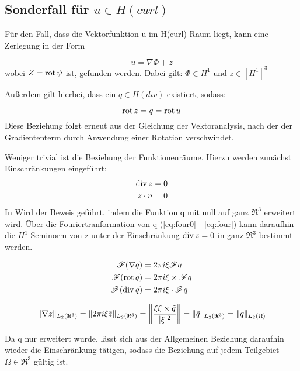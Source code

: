 \subsection{Sonderfall f\"ur $u\in H(curl)$}
F\"ur den Fall, dass die Vektorfunktion u im H(curl) Raum liegt, kann eine Zerlegung in der Form \par
\begin{equation}
	u = \nabla\Phi + z
\end{equation}
wobei $Z = \mathrm{rot}\, \psi$ ist, gefunden werden.
Dabei gilt: $\Phi\in H^1$ und $z\in [H^1]^3$\par
Au\ss{}erdem gilt hierbei, dass ein $q\in H(div)$ existiert, sodass:\par
\begin{equation}
	\mathrm{rot}\, z = q = \mathrm{rot}\, u
	\label{eq:qdef}
\end{equation}
Diese Beziehung folgt erneut aus der Gleichung der Vektoranalysis, nach der der Gradiententerm durch Anwendung einer Rotation verschwindet.
\par
Weniger trivial ist die Beziehung der Funktionenr\"aume. Hierzu werden zun\"achst Einschr\"ankungen eingef\"uhrt:
\begin{align}
	\mathrm{div}\, z &= 0\\
	z\cdot n &= 0
\end{align}
In \cite[S.24ff]{Schberl2009NumericalMF} Wird der Beweis gef\"uhrt, indem die Funktion q mit null auf ganz $\Re^3$ erweitert wird. \"Uber die Fouriertranformation von q (\ref{eq:four0} - \ref{eq:four}) kann daraufhin die $H^1$ Seminorm von z unter der Einschr\"ankung $\mathrm{div}\, z =0$ in ganz $\Re^3$ bestimmt werden.
\par
\begin{align}
	\mathcal{F}(\nabla q) &= 2\pi i\xi\mathcal{F}q \label{eq:four0}\\
	\mathcal{F}(\mathrm{rot}\, q) &= 2\pi i\xi\times\mathcal{F}q \\
	\mathcal{F}(\mathrm{div}\, q) &= 2\pi i\xi\cdot\mathcal{F}q
	\label{eq:four}
\end{align}
\par
\begin{equation}
	\|\nabla z\|_{L_2(\Re^3)} = \|2\pi i \xi \tilde{z}\|_{L_2(\Re^3)} = \bigg{\|}\frac{\xi\xi\times\tilde{q}}{|\xi|^2}\bigg{\|} = \|\tilde{q}\|_{L_2(\Re^3)} = \|q\|_{L_2(\Omega)}
\end{equation}

Da q nur erweitert wurde, l\"asst sich aus der Allgemeinen Beziehung daraufhin wieder die Einschr\"ankung t\"atigen, sodass die Beziehung auf jedem Teilgebiet $\Omega\in \Re^3$ g\"ultig ist.
